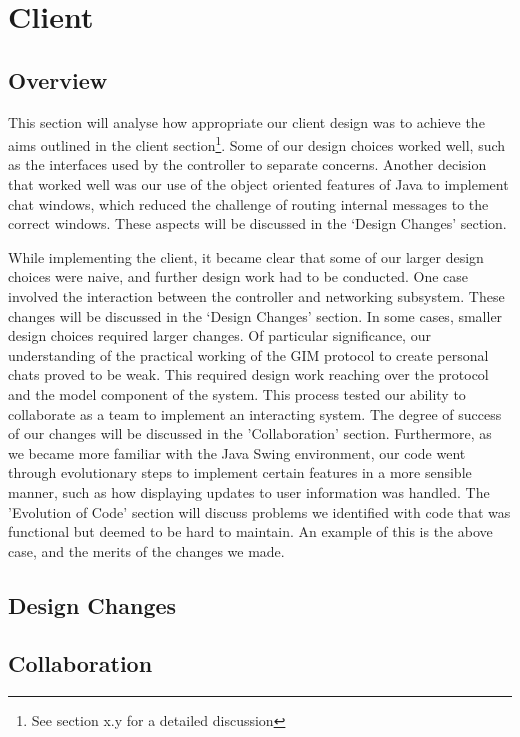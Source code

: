 \section{Client}

\subsection{Overview}

This section will analyse how appropriate our client design was to achieve the aims outlined in the client section\footnote{See section x.y for a detailed discussion}. Some of our design choices worked well, such as the interfaces used by the controller to separate concerns. Another decision that worked well was our use of the object oriented features of Java to implement chat windows, which reduced the challenge of routing internal messages to the correct windows. These aspects will be discussed in the `Design Changes' section.

While implementing the client, it became clear that some of our larger design choices were naive, and further design work had to be conducted. One case involved the interaction between the controller and networking subsystem. These changes will be discussed in the `Design Changes' section. In some cases, smaller design choices required larger changes. Of particular significance, our understanding of the practical working of the GIM protocol to create personal chats proved to be weak. This required design work reaching over the protocol and the model component of the system. This process tested our ability to collaborate as a team to implement an interacting system. The degree of success of our changes will be discussed in the 'Collaboration' section. Furthermore, as we became more familiar with the Java Swing environment, our code went through evolutionary steps to implement certain features in a more sensible manner, such as how displaying updates to user information was handled. The 'Evolution of Code' section will discuss problems we identified with code that was functional but deemed to be hard to maintain. An example of this is the above case, and the merits of the changes we made. 

\subsection{Design Changes}



\subsection{Collaboration}

